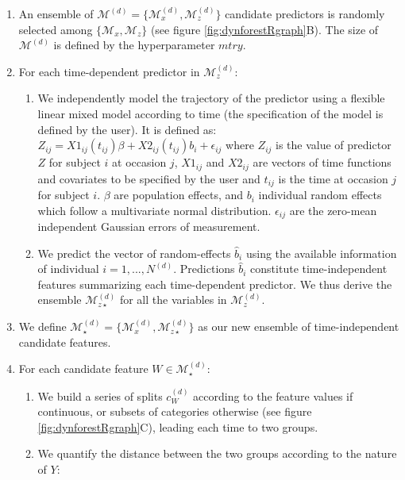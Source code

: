 \begin{enumerate}
\def\labelenumi{\arabic{enumi}.}
\item
  An ensemble of \(\mathcal{M}^{(d)}=\{\mathcal{M}_x^{(d)},\mathcal{M}_z^{(d)}\}\) candidate predictors is randomly selected among \(\{\mathcal{M}_x,\mathcal{M}_z\}\) (see figure \ref{fig:dynforestRgraph}B). The size of \(\mathcal{M}^{(d)}\) is defined by the hyperparameter \(mtry\).
\item
  For each time-dependent predictor in \(\mathcal{M}_z^{(d)}\):

  \begin{enumerate}
  \def\labelenumii{\alph{enumii}.}
  \tightlist
  \item
    We independently model the trajectory of the predictor using a flexible linear mixed model \citep{laird_random_effects_1982} according to time (the specification of the model is defined by the user). It is defined as: \(Z_{ij} = X1_{ij}(t_{ij})\beta + X2_{ij}(t_{ij})b_i + \epsilon_{ij}\) where \(Z_{ij}\) is the value of predictor \(Z\) for subject \(i\) at occasion \(j\), \(X1_{ij}\) and \(X2_{ij}\) are vectors of time functions and covariates to be specified by the user and \(t_{ij}\) is the time at occasion \(j\) for subject \(i\). \(\beta\) are population effects, and \(b_i\) individual random effects which follow a multivariate normal distribution. \(\epsilon_{ij}\) are the zero-mean independent Gaussian errors of measurement.
  \item
    We predict the vector of random-effects \(\hat{b}_i\) using the available information of individual \(i = 1, ..., N^{(d)}\). Predictions \(\hat{b}_i\) constitute time-independent features summarizing each time-dependent predictor. We thus derive the ensemble \(\mathcal{M}_{z \star}^{(d)}\) for all the variables in \(\mathcal{M}_z^{(d)}\).
  \end{enumerate}
\item
  We define \(\mathcal{M}_\star^{(d)}=\{\mathcal{M}_x^{(d)},\mathcal{M}_{z \star}^{(d)}\}\) as our new ensemble of time-independent candidate features.
\item
  For each candidate feature \(W \in \mathcal{M}_\star^{(d)}\):

  \begin{enumerate}
  \def\labelenumii{\alph{enumii}.}
  \tightlist
  \item
    We build a series of splits \(c_W^{(d)}\) according to the feature values if continuous, or subsets of categories otherwise (see figure \ref{fig:dynforestRgraph}C), leading each time to two groups.
  \item
    We quantify the distance between the two groups according to the nature of \(Y\):


\end{enumerate}
\end{enumerate}

